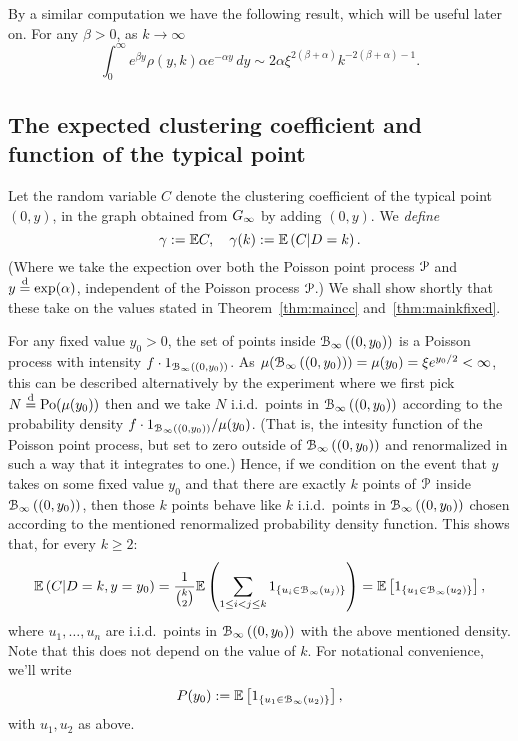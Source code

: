 By a similar computation we have the following result, which will be useful later on. For any $\beta > 0$, as $k \to \infty$
\begin{equation}\label{eq:general_integral_rho_y_k}
	\int_0^\infty e^{\beta y} \rho(y, k) \alpha e^{-\alpha y} \, dy
    \sim 2\alpha \xi^{2(\beta + \alpha)} k^{-2(\beta + \alpha)-1}.
\end{equation}


\subsection{The expected clustering coefficient and function of the typical point}


Let the random variable $C$ denote the clustering coefficient of the typical point $(0,y)$, in the graph obtained from $G_{\infty}$ by adding $(0,y)$. We {\em define}
\[
	\gamma := {\mathbb E} C, \quad \gamma(k) := {\mathbb E}\left( C | D = k \right).
\]
(Where we take the expection over both the Poisson point process ${\mathcal P}$ and $y \stackrel{\text{d}}{=} \text{exp}(\alpha)$, independent of the Poisson process ${\mathcal P}$.) We shall show shortly that these take on the values stated in Theorem~\ref{thm:maincc} and~\ref{thm:mainkfixed}.


For any fixed value $y_0>0$, the set of points inside ${\mathcal B}_{\infty}\left((0,y_0)\right)$ is a Poisson process with intensity $f \cdot 1_{{\mathcal B}_{\infty}\left((0,y_0)\right)}$. As $\mu({\mathcal B}_{\infty}\left((0,y_0)\right)) = \mu(y_0) = \xi e^{y_0/2} < \infty$, this can be described alternatively by the experiment where we first pick $N \stackrel{\text{d}}{=} {\mathrm{Po}}( \mu(y_0) )$ then and we take $N$ i.i.d.~points in ${\mathcal B}_{\infty}\left((0,y_0)\right)$ according to the probability density $f \cdot 1_{{\mathcal B}_{\infty}\left((0,y_0)\right)} / \mu(y_0)$. (That is, the intesity function of the Poisson point process, but set to zero outside of ${\mathcal B}_{\infty}\left((0,y_0)\right)$ and renormalized in such a way that it integrates to one.) Hence, if we condition on the event that $y$ takes on some fixed value $y_0$ and that there are exactly $k$ points of ${\mathcal P}$ inside ${\mathcal B}_{\infty}\left((0,y_0)\right)$, then those $k$ points behave like $k$ i.i.d.~points in ${\mathcal B}_{\infty}\left((0,y_0)\right)$ chosen according to the mentioned renormalized probability density function. This shows that, for every $k\geq 2$:
\[
	{\mathbb E}\left( C | D=k, y=y_0 \right) 
	= \frac{1}{{k\choose 2}} {\mathbb E}\left( \sum_{1\leq i < j \leq k} 1_{\{u_i\in {\mathcal B}_{\infty}\left(u_j\right)\}} \right)
	= \mathbb{E}\left[1_{\{u_1\in{\mathcal B}_{\infty}\left(u_2\right)\}}\right],
\]
where $u_1,\dots, u_n$ are i.i.d.~points in ${\mathcal B}_{\infty}\left((0,y_0)\right)$ with the above mentioned density.
Note that this does not depend on the value of $k$. For notational convenience, we'll write 
\[ 
	P(y_0) := \mathbb{E}\left[1_{\{u_1\in{\mathcal B}_{\infty}\left(u_2\right)\}}\right],
\]
with $u_1, u_2$ as above.

